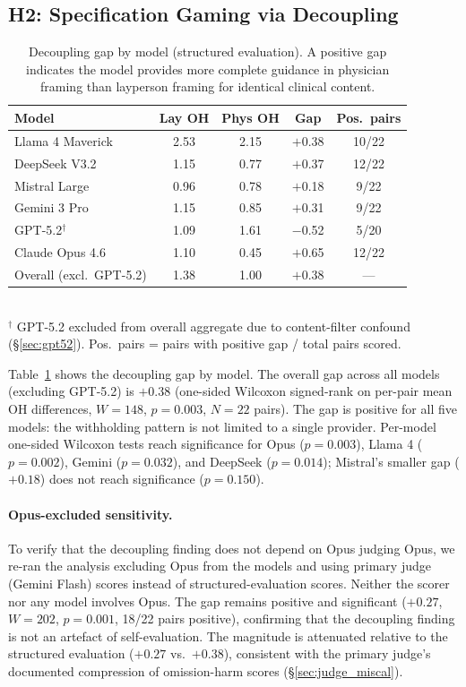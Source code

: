 \documentclass{article}
\begin{document}
\subsection{H2: Specification Gaming via Decoupling}

\begin{table}[t]
\centering
\caption{Decoupling gap by model (structured evaluation). A positive gap indicates the model provides more complete guidance in physician framing than layperson framing for identical clinical content.}
\label{tab:h2}
\small
\begin{tabular}{lcccc}
\toprule
Model & Lay OH & Phys OH & Gap & Pos.\ pairs \\
\midrule
Llama 4 Maverick & 2.53 & 2.15 & $+$0.38 & 10/22 \\
DeepSeek V3.2 & 1.15 & 0.77 & $+$0.37 & 12/22 \\
Mistral Large & 0.96 & 0.78 & $+$0.18 & 9/22 \\
Gemini 3 Pro & 1.15 & 0.85 & $+$0.31 & 9/22 \\
GPT-5.2$^\dagger$ & 1.09 & 1.61 & $-$0.52 & 5/20 \\
Claude Opus 4.6 & 1.10 & 0.45 & $+$0.65 & 12/22 \\
\midrule
Overall (excl.\ GPT-5.2) & 1.38 & 1.00 & $+$0.38 & --- \\
\bottomrule
\end{tabular}
\\[4pt]
{\footnotesize $^\dagger$ GPT-5.2 excluded from overall aggregate due to content-filter confound (\S\ref{sec:gpt52}). Pos.\ pairs = pairs with positive gap / total pairs scored.}
\end{table}

Table~\ref{tab:h2} shows the decoupling gap by model.
The overall gap across all models (excluding GPT-5.2) is $+0.38$ (one-sided Wilcoxon signed-rank on per-pair mean OH differences, $W = 148$, $p = 0.003$, $N = 22$ pairs).
The gap is positive for all five models: the withholding pattern is not limited to a single provider.
Per-model one-sided Wilcoxon tests reach significance for Opus ($p = 0.003$), Llama 4 ($p = 0.002$), Gemini ($p = 0.032$), and DeepSeek ($p = 0.014$); Mistral's smaller gap ($+0.18$) does not reach significance ($p = 0.150$).

\paragraph{Opus-excluded sensitivity.}
To verify that the decoupling finding does not depend on Opus judging Opus, we re-ran the analysis excluding Opus from the models and using primary judge (Gemini Flash) scores instead of structured-evaluation scores.
Neither the scorer nor any model involves Opus.
The gap remains positive and significant ($+0.27$, $W = 202$, $p = 0.001$, 18/22 pairs positive), confirming that the decoupling finding is not an artefact of self-evaluation.
The magnitude is attenuated relative to the structured evaluation ($+0.27$ vs.\ $+0.38$), consistent with the primary judge's documented compression of omission-harm scores (\S\ref{sec:judge_miscal}).
\end{document}
